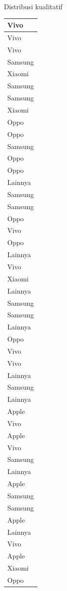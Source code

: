 \documentclass[
  ignorenonframetext,
]{beamer}
\begin{document}
\begin{frame}[s]{Distribusi kualitatif}
\begin{table}
\begin{tabular}[t]{l}
\hline
Vivo\\
\hline
Vivo\\
\hline
Vivo\\
\hline
Samsung\\
\hline
Xiaomi\\
\hline
Samsung\\
\hline
Samsung\\
\hline
Xiaomi\\
\hline
Oppo\\
\hline
Oppo\\
\hline
Samsung\\
\hline
Oppo\\
\hline
Oppo\\
\hline
Lainnya\\
\hline
Samsung\\
\hline
Samsung\\
\hline
Oppo\\
\hline
Vivo\\
\hline
Oppo\\
\hline
Lainnya\\
\hline
Vivo\\
\hline
Xiaomi\\
\hline
Lainnya\\
\hline
Samsung\\
\hline
Samsung\\
\hline
Lainnya\\
\hline
Oppo\\
\hline
Vivo\\
\hline
Vivo\\
\hline
Lainnya\\
\hline
Samsung\\
\hline
Lainnya\\
\hline
Apple\\
\hline
Vivo\\
\hline
Apple\\
\hline
Vivo\\
\hline
Samsung\\
\hline
Lainnya\\
\hline
Apple\\
\hline
Samsung\\
\hline
Samsung\\
\hline
Apple\\
\hline
Lainnya\\
\hline
Vivo\\
\hline
Apple\\
\hline
Xiaomi\\
\hline
Oppo\\

\end{tabular}
\end{table}
\end{frame}
\end{document}
